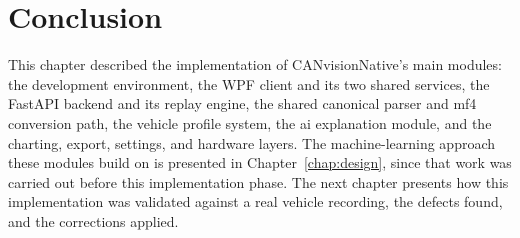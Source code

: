 \section{Conclusion}

This chapter described the implementation of CANvisionNative's main modules: the development environment, the WPF client and its two shared services, the FastAPI backend and its replay engine, the shared canonical parser and \gls{mf4} conversion path, the vehicle profile system, the \gls{ai} explanation module, and the charting, export, settings, and hardware layers. The machine-learning approach these modules build on is presented in Chapter~\ref{chap:design}, since that work was carried out before this implementation phase. The next chapter presents how this implementation was validated against a real vehicle recording, the defects found, and the corrections applied.
